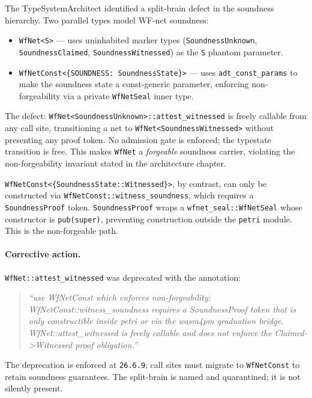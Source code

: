 The TypeSystemArchitect identified a split-brain defect in the soundness
hierarchy. Two parallel types model WF-net soundness:

\begin{itemize}
  \item \texttt{WfNet<S>} --- uses uninhabited marker types
    (\texttt{SoundnessUnknown}, \texttt{SoundnessClaimed},
    \texttt{SoundnessWitnessed}) as the \texttt{S} phantom parameter.
  \item \texttt{WfNetConst<\{SOUNDNESS: SoundnessState\}>} --- uses
    \texttt{adt\_const\_params} to make the soundness state a const-generic
    parameter, enforcing non-forgeability via a private \texttt{WfNetSeal}
    inner type.
\end{itemize}

The defect: \texttt{WfNet<SoundnessUnknown>::attest\_witnessed} is freely
callable from any call site, transitioning a net to
\texttt{WfNet<SoundnessWitnessed>} without presenting any proof token. No
admission gate is enforced; the typestate transition is free. This makes
\texttt{WfNet} a \emph{forgeable} soundness carrier, violating the
non-forgeability invariant stated in the architecture chapter.

\texttt{WfNetConst<\{SoundnessState::Witnessed\}>}, by contrast, can only be
constructed via \texttt{WfNetConst::witness\_soundness}, which requires a
\texttt{SoundnessProof} token. \texttt{SoundnessProof} wraps a
\texttt{wfnet\_seal::WfNetSeal} whose constructor is \texttt{pub(super)},
preventing construction outside the \texttt{petri} module. This is the
non-forgeable path.

\paragraph{Corrective action.}
\texttt{WfNet::attest\_witnessed} was deprecated with the annotation:

\begin{quote}
\textit{``use WfNetConst which enforces non-forgeability:
WfNetConst::witness\_soundness requires a SoundnessProof token that is only
constructible inside petri or via the wasm4pm graduation bridge.
WfNet::attest\_witnessed is freely callable and does not enforce the
Claimed->Witnessed proof obligation.''}
\end{quote}

The deprecation is enforced at \texttt{26.6.9}; call sites must migrate to
\texttt{WfNetConst} to retain soundness guarantees. The split-brain is named
and quarantined; it is not silently present.

